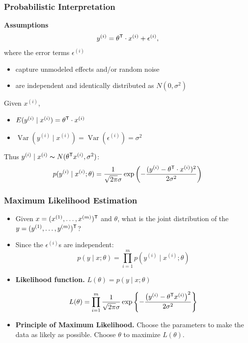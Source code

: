 \documentclass[xcolor=table]{beamer}
\newcommand{\trans}[1]{\ensuremath{#1}^{\scriptsize{\textsf{T}}}}
\DeclareMathOperator{\Var}{Var}
\begin{document}
\begin{frame}[t]
\frametitle{Probabilistic Interpretation}
\textbf{Assumptions}
\[
    y^{(i)} = \trans{\theta} \cdot x^{(i)} + \epsilon^{(i)},  
\]
where the error terms $\epsilon^{(i)}$
\begin{itemize}
    \item capture unmodeled effects and/or random noise

    \item are independent and identically distributed as $N(0, \sigma^2)$ 
\end{itemize}

\pause

\medskip

Given $x^{(i)}$, 
\begin{itemize}
    \item $E(y^{(i)} \mid x^{(i)}) = \trans{\theta} \cdot x^{(i)}$
    
    \pause

    \item $\Var(y^{(i)} \mid x^{(i)}) = \Var(\epsilon^{(i)}) = \sigma^{2}$
\end{itemize}

\pause

\medskip

Thus $y^{(i)} \mid x^{(i)} \thicksim N(\trans{\theta} x^{(i)}, \sigma^2)$:
\[
    p(y^{(i)} \mid x^{(i)} ; \theta ) = \frac{1}{\sqrt{2 \pi} \sigma} 
                        \exp{\left ( - \frac{(y^{(i)} - \trans{\theta} \cdot x^{(i)})^2}{2 \sigma^2}\right )}
\]
\end{frame}

\begin{frame}[t]
\frametitle{Maximum Likelihood Estimation}
\begin{itemize}
    \item Given $x = \trans{(x^{(1)}, \ldots, x^{(m)})}$ and $\theta$, what is the joint distribution of 
            the $y = \trans{(y^{(1)}, \ldots, y^{(m)})}$? 

    \pause
    
    \item Since the $\epsilon^{(i)}$s are independent: \pause 
        \[
            p(y \mid x ; \theta) = \prod_{i = 1}^{m} p(y^{(i)} \mid x^{(i)} ; \theta)
        \]

    \pause

    \item \textbf{Likelihood function.} $L(\theta) = p(y \mid x ; \theta)$ 

    \pause
        
    \[
        L(\theta) = \prod_{i = 1}^{m} \frac{1}{\sqrt{2 \pi} \sigma} 
            \exp{\left \{ - \frac{\left ( y^{(i)} - \trans{\theta} x^{(i)} \right ) ^2}{2 \sigma^2} \right \}}
    \]
    
    \pause

    \item \textbf{Principle of Maximum Likelihood.} Choose the parameters to make the data as likely 
        as possible. Choose $\theta$ to maximize $L(\theta)$.
\end{itemize}
\end{frame}
\end{document}
